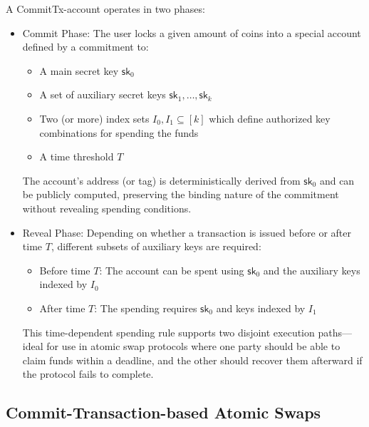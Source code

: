 A CommitTx-account operates in two phases:
\begin{itemize}
	\item Commit Phase: The user locks a given amount of coins into a special account defined by a commitment to:
	\begin{itemize}
		\item A main secret key $\mathsf{sk}_0$

		\item A set of auxiliary secret keys $\mathsf{sk}_1, \dots, \mathsf{sk}_k$

		\item Two (or more) index sets $I_0, I_1 \subseteq [k]$ which define authorized key combinations for spending the funds

		\item A time threshold $T$
	\end{itemize}

The account's address (or tag) is deterministically derived from $\mathsf{sk}_0$ and can be publicly computed, preserving the binding nature of the commitment without revealing spending conditions.

\item Reveal Phase: Depending on whether a transaction is issued before or after time $T$, different subsets of auxiliary keys are required:

	\begin{itemize}
		\item Before time $T$: The account can be spent using $\mathsf{sk}_0$ and the auxiliary keys indexed by $I_0$

		\item After time $T$: The spending requires $\mathsf{sk}_0$ and keys indexed by $I_1$

	\end{itemize}
This time-dependent spending rule supports two disjoint execution paths—ideal for use in atomic swap protocols where one party should be able to claim funds within a deadline, and the other should recover them afterward if the protocol fails to complete.
\end{itemize}


\subsection{Commit-Transaction-based Atomic Swaps}

